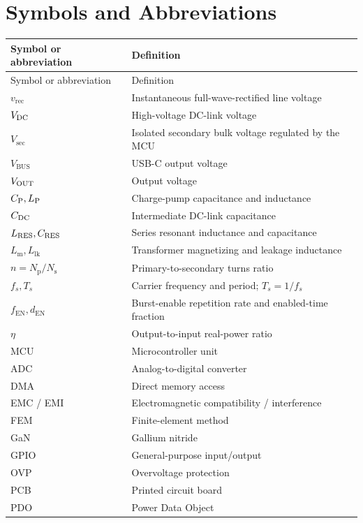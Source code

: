 \section*{Symbols and Abbreviations}

\begin{longtable}{@{}L{0.23\textwidth}L{0.69\textwidth}@{}}
\toprule
Symbol or abbreviation & Definition\\
\midrule
\endfirsthead
\toprule
Symbol or abbreviation & Definition\\
\midrule
\endhead
\(v_{\mathrm{rec}}\) & Instantaneous full-wave-rectified line voltage\\
\(V_{\mathrm{DC}}\) & High-voltage DC-link voltage\\
\(V_{\mathrm{sec}}\) & Isolated secondary bulk voltage regulated by the MCU\\
\(V_{\mathrm{BUS}}\) & USB-C output voltage\\
\(V_{\mathrm{OUT}}\) & Output voltage\\
\(C_{\mathrm{P}},L_{\mathrm{P}}\) & Charge-pump capacitance and inductance\\
\(C_{\mathrm{DC}}\) & Intermediate DC-link capacitance\\
\(L_{\mathrm{RES}},C_{\mathrm{RES}}\) & Series resonant inductance and capacitance\\
\(L_{\mathrm{m}},L_{\mathrm{lk}}\) & Transformer magnetizing and leakage inductance\\
\(n=N_{\mathrm{p}}/N_{\mathrm{s}}\) & Primary-to-secondary turns ratio\\
\(f_s,T_s\) & Carrier frequency and period; \(T_s=1/f_s\)\\
\(f_{\mathrm{EN}},d_{\mathrm{EN}}\) & Burst-enable repetition rate and enabled-time fraction\\
\(\eta\) & Output-to-input real-power ratio\\
MCU & Microcontroller unit\\
ADC & Analog-to-digital converter\\
DMA & Direct memory access\\
EMC / EMI & Electromagnetic compatibility / interference\\
FEM & Finite-element method\\
GaN & Gallium nitride\\
GPIO & General-purpose input/output\\
OVP & Overvoltage protection\\
PCB & Printed circuit board\\
PDO & Power Data Object\\

\end{longtable}
